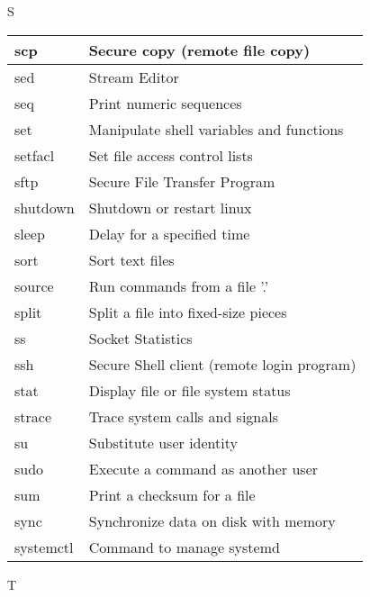 \begin{flushleft}
\newpage

\begin{tcolorbox}
	\textsc{S}
\end{tcolorbox}

\begin{tabular}{lp{12cm}}
	\hline
	scp &	Secure copy (remote file copy) \\
	\hline
	sed &	Stream Editor \\
	\hline
	seq &	Print numeric sequences \\
	\hline
	set &	Manipulate shell variables and functions \\
	\hline
	setfacl &	Set file access control lists \\
	\hline
	sftp &	Secure File Transfer Program \\
	\hline
	shutdown &	Shutdown or restart linux \\
	\hline
	sleep &	Delay for a specified time \\
	\hline
	sort &	Sort text files \\
	\hline
	source &	Run commands from a file '.'  \\
	\hline
	split &	Split a file into fixed-size pieces \\
	\hline
	ss &	Socket Statistics \\
	\hline
	ssh	& Secure Shell client (remote login program) \\
	\hline
	stat &	Display file or file system status \\
	\hline
	strace	&  Trace system calls and signals \\
	\hline
	su &	Substitute user identity \\
	\hline
	sudo &	Execute a command as another user \\
	\hline
	sum &	Print a checksum for a file \\
	\hline
	sync &	Synchronize data on disk with memory \\
	\hline
	systemctl &	Command to manage systemd \\
	\hline
\end{tabular}

\newpage

\begin{tcolorbox}
	\textsc{T}
\end{tcolorbox}


\end{flushleft}
